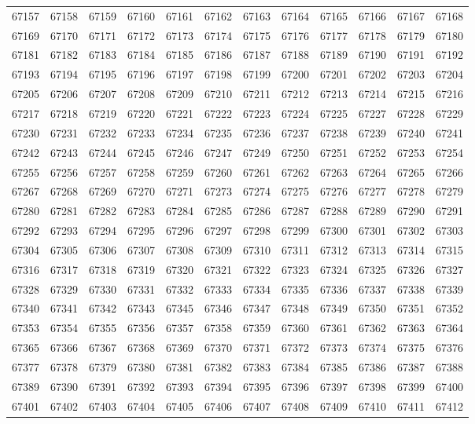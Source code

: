 \begin{center}
\begin{longtable}{llllllllllll}
67157 &67158 &67159 &67160 &67161 &67162 &67163 &67164 &67165 &67166 &67167 &67168 \\
67169 &67170 &67171 &67172 &67173 &67174 &67175 &67176 &67177 &67178 &67179 &67180 \\
67181 &67182 &67183 &67184 &67185 &67186 &67187 &67188 &67189 &67190 &67191 &67192 \\
67193 &67194 &67195 &67196 &67197 &67198 &67199 &67200 &67201 &67202 &67203 &67204 \\
67205 &67206 &67207 &67208 &67209 &67210 &67211 &67212 &67213 &67214 &67215 &67216 \\
67217 &67218 &67219 &67220 &67221 &67222 &67223 &67224 &67225 &67227 &67228 &67229 \\
67230 &67231 &67232 &67233 &67234 &67235 &67236 &67237 &67238 &67239 &67240 &67241 \\
67242 &67243 &67244 &67245 &67246 &67247 &67249 &67250 &67251 &67252 &67253 &67254 \\
67255 &67256 &67257 &67258 &67259 &67260 &67261 &67262 &67263 &67264 &67265 &67266 \\
67267 &67268 &67269 &67270 &67271 &67273 &67274 &67275 &67276 &67277 &67278 &67279 \\
67280 &67281 &67282 &67283 &67284 &67285 &67286 &67287 &67288 &67289 &67290 &67291 \\
67292 &67293 &67294 &67295 &67296 &67297 &67298 &67299 &67300 &67301 &67302 &67303 \\
67304 &67305 &67306 &67307 &67308 &67309 &67310 &67311 &67312 &67313 &67314 &67315 \\
67316 &67317 &67318 &67319 &67320 &67321 &67322 &67323 &67324 &67325 &67326 &67327 \\
67328 &67329 &67330 &67331 &67332 &67333 &67334 &67335 &67336 &67337 &67338 &67339 \\
67340 &67341 &67342 &67343 &67345 &67346 &67347 &67348 &67349 &67350 &67351 &67352 \\
67353 &67354 &67355 &67356 &67357 &67358 &67359 &67360 &67361 &67362 &67363 &67364 \\
67365 &67366 &67367 &67368 &67369 &67370 &67371 &67372 &67373 &67374 &67375 &67376 \\
67377 &67378 &67379 &67380 &67381 &67382 &67383 &67384 &67385 &67386 &67387 &67388 \\
67389 &67390 &67391 &67392 &67393 &67394 &67395 &67396 &67397 &67398 &67399 &67400 \\
67401 &67402 &67403 &67404 &67405 &67406 &67407 &67408 &67409 &67410 &67411 &67412 \\

\end{longtable}
\end{center}
